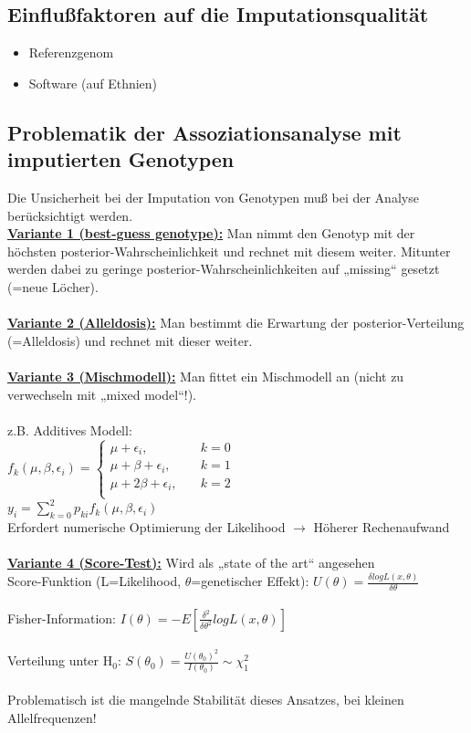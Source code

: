 \subsection{Einflußfaktoren auf die Imputationsqualität}
\begin{itemize}
	\item Referenzgenom
	\item Software (auf Ethnien)
\end{itemize}

\subsection{Problematik der Assoziationsanalyse mit imputierten Genotypen}
Die Unsicherheit bei der Imputation von Genotypen muß bei der Analyse berücksichtigt werden.\\

\underline{\textbf{Variante 1 (best-guess genotype):}} Man nimmt den Genotyp mit der höchsten posterior-Wahrscheinlichkeit und rechnet mit diesem weiter. Mitunter werden dabei zu geringe posterior-Wahrscheinlichkeiten auf „missing“ gesetzt (=neue Löcher).
\\\\
\underline{\textbf{Variante 2 (Alleldosis):}} Man bestimmt die Erwartung der posterior-Verteilung (=Alleldosis) und rechnet mit dieser weiter.
\\\\
\underline{\textbf{Variante 3 (Mischmodell):}} Man fittet ein Mischmodell an (nicht zu verwechseln mit „mixed model“!).
\\\\
z.B. Additives Modell:\\
$f_k(\mu,\beta,\epsilon_i)=
\begin{cases}
     \mu + \epsilon_i, & \quad k=0\\
     \mu + \beta + \epsilon_i, & \quad k=1\\
     \mu + 2\beta + \epsilon_i, & \quad k=2\\
\end{cases}
$\\

$y_i=\displaystyle \sum_{k=0}^2 p_{ki}f_k(\mu, \beta, \epsilon_i)$\\
Erfordert numerische Optimierung der Likelihood $\rightarrow$ Höherer Rechenaufwand
\\\\
\underline{\textbf{Variante 4 (Score-Test):}} Wird als „state of the art“ angesehen\\
Score-Funktion (L=Likelihood, $\theta$=genetischer Effekt): $U(\theta)=\frac{\delta log L(x,\theta)}{\delta \theta}$\\\\
Fisher-Information: $I(\theta)=-E[\frac{\delta^2}{\delta \theta^2} log L(x,\theta)]$\\\\
Verteilung unter H$_0$: $S(\theta_0)=\frac{U(\theta_0)^2}{I(\theta_0)} \sim \chi_1^2$
\\\\
Problematisch ist die mangelnde Stabilität dieses Ansatzes, bei kleinen Allelfrequenzen!